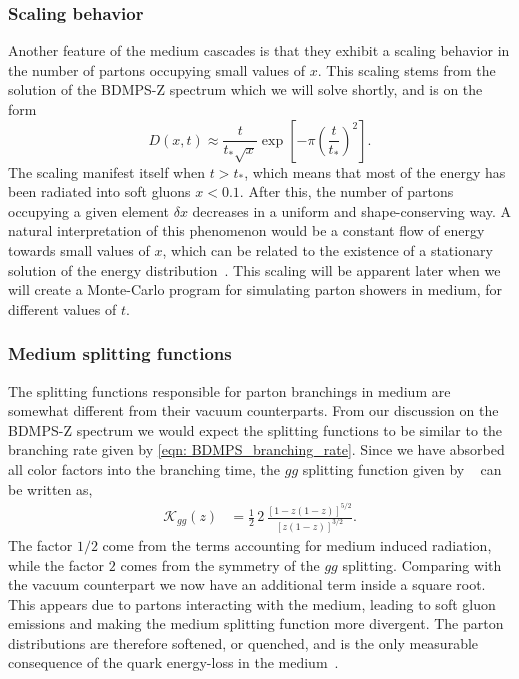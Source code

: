 \documentclass[main.tex]{subfiles}
\begin{document}
\subsubsection*{Scaling behavior}
Another feature of the medium cascades is that they exhibit a scaling behavior in the number of partons occupying small values of \(x\). This scaling stems from the solution of the BDMPS-Z spectrum which we will solve shortly, and is on the form
\begin{equation}\label{eqn: BDMPS_scaling_behavior}
    D(x,t) \approx \frac{t}{t_*\sqrt{x}} \exp \left[-\pi \left(\frac{t}{t_*}\right)^2\right].
\end{equation}
The scaling manifest itself when \(t > t_*\), which means that most of the energy has been radiated into soft gluons \(x<0.1\). After this, the number of partons occupying a given element \(\delta x\) decreases in a uniform and shape-conserving way. A natural interpretation of this phenomenon would be a constant flow of energy towards small values of \(x\), which can be related to the existence of a stationary solution of the energy distribution~\cite{Energy_flow_medium_cascade_2016}. This scaling will be apparent later when we will create a Monte-Carlo program for simulating parton showers in medium, for different values of \(t\). 

\subsubsection*{Medium splitting functions}\label{sec: medium_splitting_functions}
The splitting functions responsible for parton branchings in medium are somewhat different from their vacuum counterparts. From our discussion on the BDMPS-Z spectrum we would expect the splitting functions to be similar to the branching rate given by \autoref{eqn: BDMPS_branching_rate}. Since we have absorbed all color factors into the branching time, the \(gg\) splitting function given by ~\cite{Universal_quark_gluon_ratio_in_medium-induced_parton_cascade} can be written as,
\begin{align}
    \mathcal{K}_{gg}(z) &= \frac{1}{2}\,2\, \frac{\left[1-z(1-z) \right]^{5/2}}{\left[z(1-z)\right]^{3/2}}. \label{eqn: medium_splittingfunctions_gg}
\end{align}
The factor \(1/2\) come from the terms accounting for medium induced radiation, while the factor \(2\) comes from the symmetry of the \(gg\) splitting. Comparing with the vacuum counterpart we now have an additional term inside a square root. This appears due to partons interacting with the medium, leading to soft gluon emissions and making the medium splitting function more divergent. The parton distributions are therefore softened, or quenched, and is the only measurable consequence of the quark energy-loss in the medium~\cite{Wang_2001_Multiple_Parton_Scattering}.
\end{document}
